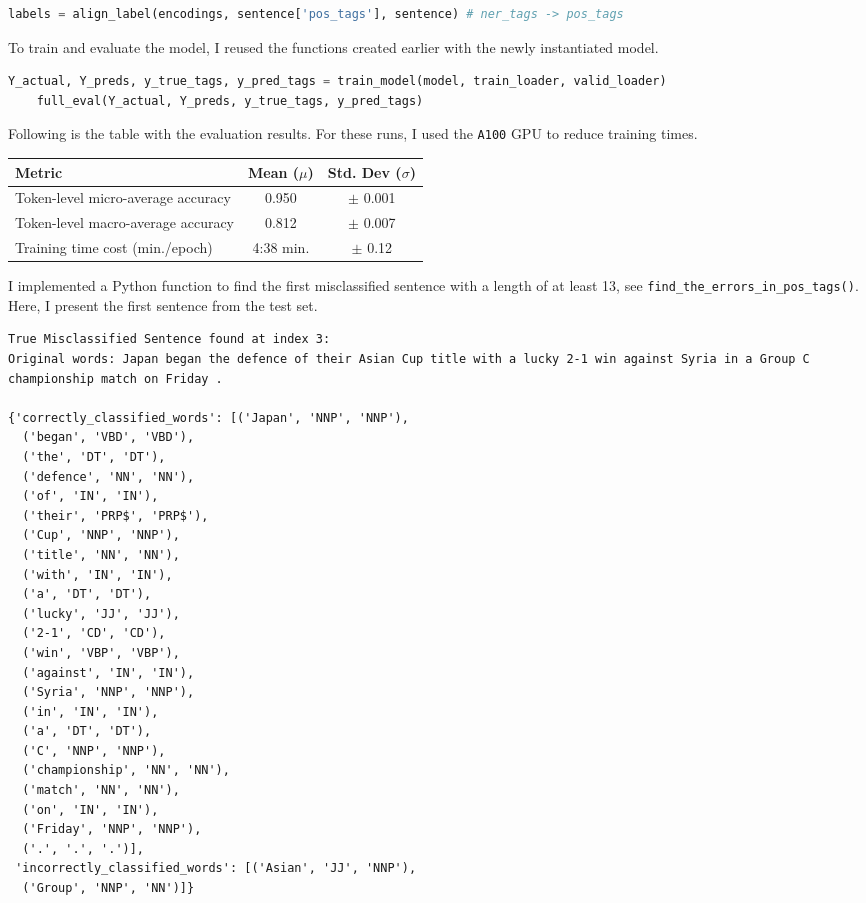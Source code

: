 \documentclass[12pt,a4paper]{report}%
\begin{document}
\begin{lstlisting}[language=Python]
    labels = align_label(encodings, sentence['pos_tags'], sentence) # ner_tags -> pos_tags
\end{lstlisting}

To train and evaluate the model, I reused the functions created earlier with the newly instantiated model.

\begin{lstlisting}[language=Python]
    Y_actual, Y_preds, y_true_tags, y_pred_tags = train_model(model, train_loader, valid_loader)
    full_eval(Y_actual, Y_preds, y_true_tags, y_pred_tags)
\end{lstlisting}

Following is the table with the evaluation results. For these runs, I used the \lstinline{A100} GPU to reduce training times.


\begin{table}[h]
\centering
\begin{tabular}{|p{6cm}|c|c|}
\hline
\textbf{Metric} & \textbf{Mean ($\mu$)} & \textbf{Std. Dev ($\sigma$)} \\ \hline
Token-level micro-average accuracy & 0.950 & $\pm$ 0.001 \\ \hline
Token-level macro-average accuracy & 0.812 & $\pm$ 0.007 \\ \hline
Training time cost (min./epoch)         & 4:38 min. & $\pm$ 0.12 \\ \hline
\end{tabular}
\end{table}

I implemented a Python function to find the first misclassified sentence with a length of at least 13, see \lstinline{find_the_errors_in_pos_tags()}. Here, I present the first sentence from the test set.

\begin{lstlisting}
True Misclassified Sentence found at index 3:
Original words: Japan began the defence of their Asian Cup title with a lucky 2-1 win against Syria in a Group C championship match on Friday .

{'correctly_classified_words': [('Japan', 'NNP', 'NNP'),
  ('began', 'VBD', 'VBD'),
  ('the', 'DT', 'DT'),
  ('defence', 'NN', 'NN'),
  ('of', 'IN', 'IN'),
  ('their', 'PRP$', 'PRP$'),
  ('Cup', 'NNP', 'NNP'),
  ('title', 'NN', 'NN'),
  ('with', 'IN', 'IN'),
  ('a', 'DT', 'DT'),
  ('lucky', 'JJ', 'JJ'),
  ('2-1', 'CD', 'CD'),
  ('win', 'VBP', 'VBP'),
  ('against', 'IN', 'IN'),
  ('Syria', 'NNP', 'NNP'),
  ('in', 'IN', 'IN'),
  ('a', 'DT', 'DT'),
  ('C', 'NNP', 'NNP'),
  ('championship', 'NN', 'NN'),
  ('match', 'NN', 'NN'),
  ('on', 'IN', 'IN'),
  ('Friday', 'NNP', 'NNP'),
  ('.', '.', '.')],
 'incorrectly_classified_words': [('Asian', 'JJ', 'NNP'),
  ('Group', 'NNP', 'NN')]}
\end{lstlisting}
\end{document}
